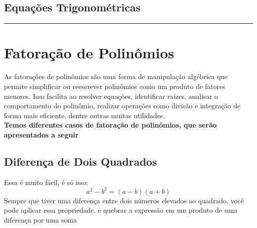 \documentclass{article}
\begin{document}
\subsection{Equações Trigonométricas}

\vspace{15pt}
\hrule

\section{Fatoração de Polinômios}
As fatorações de polinômios são uma forma de manipulação algébrica que permite simplificar ou reescrever polinômios como um produto de fatores menores. Isso facilita ao resolver equações, identificar raízes, analisar o comportamento do polinômio, realizar operações como divisão e integração de forma mais eficiente, dentre outras muitas utilidades.
\\[10pt]
\textbf{Temos diferentes casos de fatoração de polinômios, que serão apresentados a seguir}
\subsection{Diferença de Dois Quadrados}
Essa é muito fácil, é só isso:
\[
a^2 - b^2 = (a - b)(a + b)
\]
Sempre que tiver uma diferença entre dois números elevados ao quadrado, você pode aplicar essa propriedade, e quebrar a expressão em um produto de uma diferença por uma soma
\end{document}
